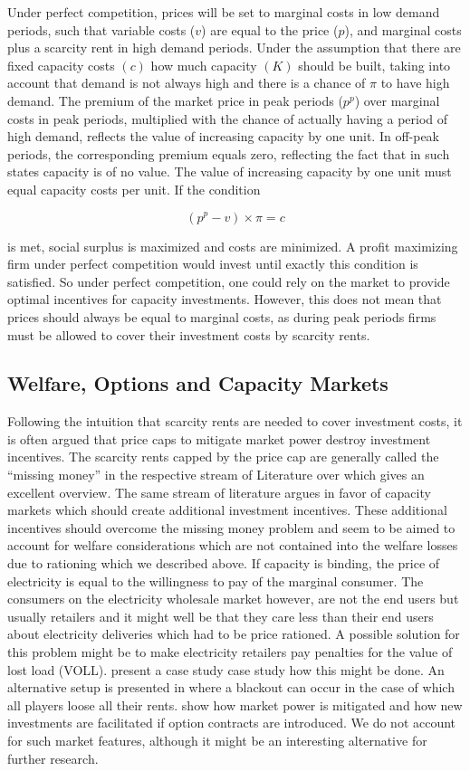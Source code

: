 Under perfect competition, prices will be set to marginal costs in low demand periods, such that variable costs ($v$) are equal to the price ($p$), and marginal costs plus a scarcity rent in high demand periods. Under the assumption that there are fixed capacity costs $(c)$ how much capacity $(K)$ should be built, taking into account that demand is not always high and there is a chance of $\pi$ to have high demand. The premium of the market price in peak periods ($p^p$) over marginal costs in peak periods, multiplied with the chance of actually having a period of high demand, reflects the value of increasing capacity by one unit. In off-peak periods, the corresponding premium equals zero, reflecting the fact that in such states capacity is of no value. The value of increasing capacity by one unit must equal capacity costs per unit. If the condition

$$(p^p-v)\times\pi=c$$

is met, social surplus is maximized and costs are minimized. A profit maximizing firm under perfect competition would invest until exactly this condition is satisfied. So under perfect competition, one could rely on the market to provide optimal incentives for capacity investments. However, this does not mean that prices should always be equal to marginal costs, as during peak periods firms must be allowed to cover their investment costs by scarcity rents. 

\subsection{Welfare, Options and Capacity Markets}

Following the intuition that scarcity rents are needed to cover investment costs, it is often argued that price caps to mitigate market power destroy investment incentives. The scarcity rents capped by the price cap are generally called the "`missing money"' in the respective stream of Literature over which \cite{Cramton2006} gives an excellent overview.
The same stream of literature argues in favor of capacity markets which should create additional investment incentives. These additional incentives should overcome the missing money problem and seem to be aimed to account for welfare considerations which are not contained into the welfare losses due to rationing which we described above. If capacity is binding, the price of electricity is equal to the willingness to pay of the marginal consumer. The consumers on the electricity wholesale market however, are not the end users but usually retailers and it might well be that they care less than their end users about electricity deliveries which had to be price rationed. A possible solution for this problem might be to make electricity retailers pay penalties for the value of lost load (VOLL). \cite{Burger2007} present a case study case study how this might be done.
An alternative setup is presented in \cite{Boom2007} where a blackout can occur in the case of which all players loose all their rents.
\cite{Chao2004} show how market power is mitigated and how new investments are facilitated if option contracts are introduced. We do not account for such market features, although it might be an interesting alternative for further research.

